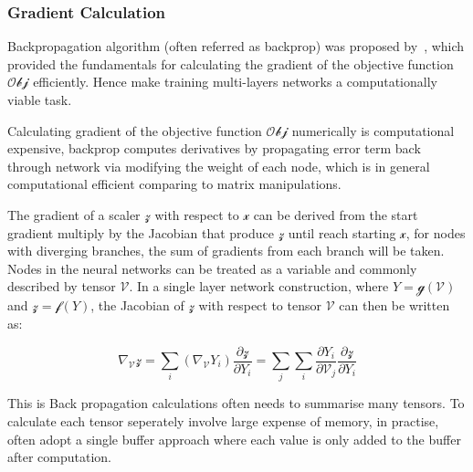 \subsubsection{Gradient Calculation}
Backpropagation algorithm (often referred as backprop) was proposed by~\citet{werbos1975beyond}, which provided the fundamentals for calculating the gradient of the objective function $\mathcal{Obj}$ efficiently. Hence make training multi-layers networks a computationally viable task. 
\par
Calculating gradient of the objective function $\mathcal{Obj}$ numerically is computational expensive, backprop computes derivatives by propagating error term back through network via modifying the weight of each node, which is in general computational efficient comparing to matrix manipulations. 
\par
The gradient of a scaler $\mathcal{z}$ with respect to $\mathcal{x}$ can be derived from the start gradient multiply by the Jacobian that produce $\mathcal{z}$ until reach starting $\mathcal{x}$, for nodes with diverging branches, the sum of gradients from each branch will be taken. Nodes in the neural networks can be treated as a variable and commonly described by tensor $\mathcal{V}$. In a single layer network construction, where $Y=\mathcal{g}(\mathcal{V})$ and $\mathcal{z} = \mathcal{f}(Y)$, the Jacobian of $\mathcal{z}$ with respect to tensor $\mathcal{V}$ can then be written as:

\begin{equation}
    \nabla_{\mathcal{V}}\mathcal{z} = \sum_i (\nabla_{\mathcal{\mathcal{V}}} Y_i)\frac{\partial\mathcal{z}}{\partial Y_i} = \sum_j \sum_i \frac{\partial Y_i} {\partial{\mathcal{V}}_j}\frac{\partial\mathcal{z}}{\partial Y_i}
\end{equation}

This is 
Back propagation calculations often needs to summarise many tensors. To calculate each tensor seperately involve large expense of memory, in practise, often adopt a single buffer approach where each value is only added to the buffer after computation.